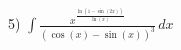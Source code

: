 \documentclass{article}
\begin{document}
\pagebreak

5) ${\displaystyle \int \frac{x^{\frac{\ln(1-\sin(2x))}{\ln(x)}}}{(\cos(x)-\sin(x))^3} \,dx}$ \newline
\end{document}
